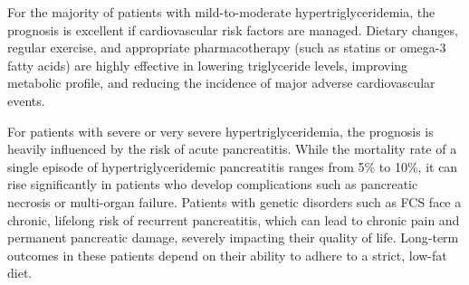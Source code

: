 For the majority of patients with mild-to-moderate hypertriglyceridemia, the prognosis is excellent if cardiovascular risk factors are managed. Dietary changes, regular exercise, and appropriate pharmacotherapy (such as statins or omega-3 fatty acids) are highly effective in lowering triglyceride levels, improving metabolic profile, and reducing the incidence of major adverse cardiovascular events.

For patients with severe or very severe hypertriglyceridemia, the prognosis is heavily influenced by the risk of acute pancreatitis. While the mortality rate of a single episode of hypertriglyceridemic pancreatitis ranges from 5\% to 10\%, it can rise significantly in patients who develop complications such as pancreatic necrosis or multi-organ failure. Patients with genetic disorders such as FCS face a chronic, lifelong risk of recurrent pancreatitis, which can lead to chronic pain and permanent pancreatic damage, severely impacting their quality of life. Long-term outcomes in these patients depend on their ability to adhere to a strict, low-fat diet.

